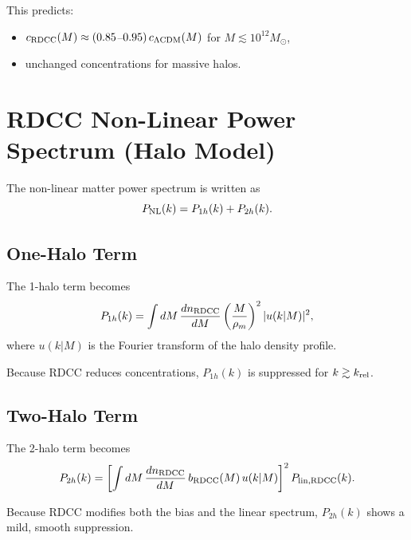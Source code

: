 \documentclass[11pt,a4paper]{article}
\begin{document}
This predicts:
\begin{itemize}
\item $c_{\rm RDCC}(M) \approx (0.85$–$0.95)\,c_{\Lambda{\rm CDM}}(M)$ for $M \lesssim 10^{12}M_\odot$,
\item unchanged concentrations for massive halos.
\end{itemize}

\section{RDCC Non-Linear Power Spectrum (Halo Model)}

The non-linear matter power spectrum is written as
\begin{equation}
P_{\rm NL}(k)
= P_{1h}(k) + P_{2h}(k).
\end{equation}

\subsection{One-Halo Term}

The 1-halo term becomes
\begin{equation}
P_{1h}(k)
= \int dM\,\frac{dn_{\rm RDCC}}{dM}
\left(\frac{M}{\rho_m}\right)^2
|u(k|M)|^2,
\end{equation}
where $u(k|M)$ is the Fourier transform of the halo density profile.

Because RDCC reduces concentrations, $P_{1h}(k)$ is suppressed for $k \gtrsim k_{\rm rel}$.

\subsection{Two-Halo Term}

The 2-halo term becomes
\begin{equation}
P_{2h}(k)
= \left[
\int dM\,\frac{dn_{\rm RDCC}}{dM}\,b_{\rm RDCC}(M)\,u(k|M)
\right]^2
P_{\rm lin,RDCC}(k).
\end{equation}

Because RDCC modifies both the bias and the linear spectrum, $P_{2h}(k)$ shows a mild,
smooth suppression.
\end{document}

